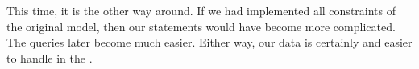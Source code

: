 This time, it is the other way around.
If we had implemented all constraints of the original model, then our  statements would have become more complicated.
The queries later become much easier.
Either way, our data is certainly  and easier to handle in the .%
\FloatBarrier%
\endhsection%
\endhsection%
%
